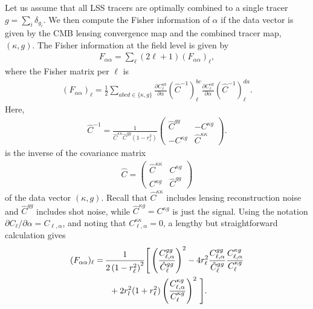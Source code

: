 \documentclass[prd,superscriptaddress,floatfix,notitlepage,nofootinbib,reprint]{revtex4-1} %
\begin{document}
Let us assume that all LSS tracers are optimally combined to a single tracer $g=\sum_i \delta_{g_i}$.
We then compute the Fisher information of $\alpha$ if the data vector is given by the CMB lensing convergence map and the combined tracer map, $(\kappa, g)$.
The Fisher information at the field level is given by
\begin{align}
  \label{eq:FisherFieldLevel}
F_{\alpha\alpha}=\sum_\ell (2\ell+1)(F_{\alpha\alpha})_\ell,
\end{align}
where the Fisher matrix per $\ell$ is
\begin{align}
  \label{eq:FisherPerMode}
  (F_{\alpha\alpha})_\ell = \frac{1}{2}\sum_{abcd\in\{\kappa,g\}}
\frac{\partial C^{ab}_\ell}{\partial\alpha}
(\hat C^{-1})^{bc}_\ell
\frac{\partial C^{cd}_\ell}{\partial\alpha}
(\hat C^{-1})^{da}_\ell.
\end{align}
Here, 
\begin{align}
  \label{eq:9}
  \hat C^{-1} = \frac{1}{\hat C^{\kappa\kappa}\hat C^{gg}(1-r_\ell^2)}
  \begin{pmatrix}
    \hat C^{gg} & - C^{\kappa g} \\
    -C^{\kappa g} & \hat C^{\kappa\kappa}
  \end{pmatrix}.
\end{align}
is the inverse of the covariance matrix
\begin{align}
  \label{eq:9}
  \hat C = 
  \begin{pmatrix}
    \hat C^{\kappa\kappa} & C^{\kappa g} \\
    C^{\kappa g} & \hat C^{gg}
  \end{pmatrix}
\end{align}
of the data vector $(\kappa,g)$.
Recall that $\hat C^{\kappa\kappa}$ includes lensing reconstruction noise and $\hat C^{gg}$ includes shot noise, while $\hat C^{\kappa g}=C^{\kappa g}$ is just the signal.
Using the notation $\partial C_\ell/\partial \alpha=C_{\ell,\alpha}$, and noting that $C^{\kappa\kappa}_{\ell,\alpha}=0$, a lengthy but straightforward calculation gives
\begin{align}
  (F_{\alpha\alpha})_\ell = \,&
\frac{1}{2\left(1-r_\ell^2\right)^2}\Bigg[ 
\left(\frac{C^{gg}_{\ell,\alpha}}{\hat C_\ell^{gg}}\right)^2
-4r_\ell^2 
\frac{C^{gg}_{\ell,\alpha}}{\hat C^{gg}_\ell}
\frac{C^{\kappa g}_{\ell,\alpha}}{C^{\kappa g}_\ell}
\nonumber\\
&\;\;+2r_l^2(1+r_\ell^2)
\left(\frac{C^{\kappa g}_{\ell,\alpha}}{C^{\kappa g}_\ell}\right)^2\,
\Bigg].
  \label{eq:FisherAlphaFinal}
\end{align}
\end{document}
